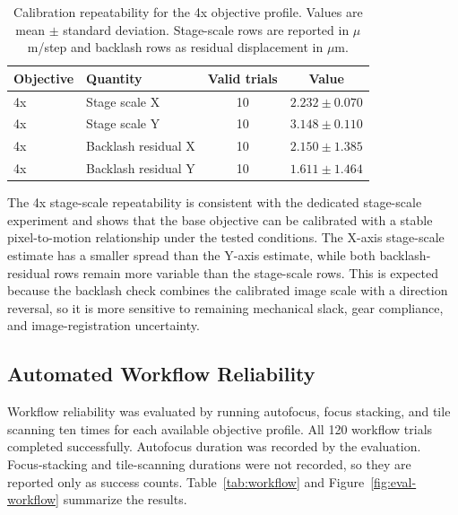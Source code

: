 

\begin{table}[H]
    \centering
    \caption[4x calibration repeatability]{Calibration repeatability for the 4x objective profile. Values are mean $\pm$
    standard deviation. Stage-scale rows are reported in $\mu$m/step and backlash rows as residual
    displacement in $\mu$m.}
    \label{tab:calib-repeat}
    \begin{tabular}{@{}l l c c@{}}
        \toprule
        \textbf{Objective} & \textbf{Quantity} & \textbf{Valid trials} & \textbf{Value} \\
        \midrule
        4x  & Stage scale X & 10 & $2.232 \pm 0.070$ \\
        4x  & Stage scale Y & 10 & $3.148 \pm 0.110$ \\
        4x  & Backlash residual X & 10 & $2.150 \pm 1.385$ \\
        4x  & Backlash residual Y & 10 & $1.611 \pm 1.464$ \\
        \bottomrule
    \end{tabular}
\end{table}

The 4x stage-scale repeatability is consistent with the dedicated stage-scale experiment and shows that the base objective can be calibrated with a stable pixel-to-motion relationship under the tested conditions. The X-axis stage-scale estimate has a smaller spread than the Y-axis estimate, while both backlash-residual rows remain more variable than the stage-scale rows. This is expected because the backlash check combines the calibrated image scale with a direction reversal, so it is more sensitive to remaining mechanical slack, gear compliance, and image-registration uncertainty.

\subsection{Automated Workflow Reliability}

Workflow reliability was evaluated by running autofocus, focus stacking, and tile scanning ten times for each available objective profile. All 120 workflow trials completed successfully. Autofocus duration was recorded by the evaluation. Focus-stacking and tile-scanning durations were not recorded, so they are reported only as success counts. Table~\ref{tab:workflow} and Figure~\ref{fig:eval-workflow} summarize the results.



